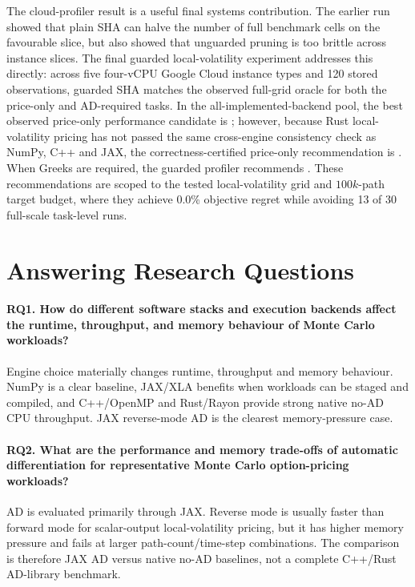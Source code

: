 The cloud-profiler result is a useful final systems contribution. The earlier
 run showed that plain SHA can halve the number
of full benchmark cells on the favourable  slice, but also
showed that unguarded pruning is too brittle across instance slices. The final
guarded local-volatility experiment addresses this directly: across five
four-vCPU Google Cloud instance types and 120 stored observations, guarded SHA
matches the observed full-grid oracle for both the price-only and AD-required
tasks. In the all-implemented-backend pool, the best observed price-only
performance candidate is ; however, because Rust
local-volatility pricing has not passed the same cross-engine consistency check
as NumPy, C++ and JAX, the correctness-certified price-only recommendation is
. When Greeks are required, the guarded profiler
recommends . These recommendations are scoped
to the tested local-volatility grid and \(100k\)-path target budget, where they
achieve 0.0\% objective regret while avoiding 13 of 30 full-scale task-level
runs.

\section{Answering Research Questions}

\paragraph{RQ1. How do different software stacks and execution backends affect the runtime, throughput, and memory behaviour of Monte Carlo workloads?}
Engine choice materially changes runtime, throughput and memory behaviour.
NumPy is a clear baseline, JAX/XLA benefits when workloads can be staged and
compiled, and C++/OpenMP and Rust/Rayon provide strong native no-AD CPU
throughput. JAX reverse-mode AD is the clearest memory-pressure case.

\paragraph{RQ2. What are the performance and memory trade-offs of automatic differentiation for representative Monte Carlo option-pricing workloads?}
AD is evaluated primarily through JAX. Reverse mode is usually faster than
forward mode for scalar-output local-volatility pricing, but it has higher
memory pressure and fails at larger path-count/time-step combinations. The
comparison is therefore JAX AD versus native no-AD baselines, not a complete
C++/Rust AD-library benchmark.

